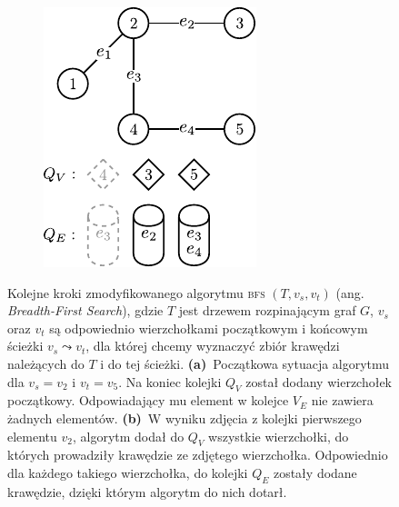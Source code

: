 \begin{savenotes}
\begin{figure}
\begin{subfigure}[b]{0.24\textwidth}
			\caption{}
			\label{fig:bfsExample:c}
		\end{subfigure}
		\hfill
		\begin{subfigure}[b]{0.24\textwidth}
			\includegraphics[width=\textwidth]{Chapter_V/BFS-example/d}
			\caption{}
			\label{fig:bfsExample:d}
		\end{subfigure}
		\hfill\null
		\caption[Kolejne kroki zmodyfikowanego algorytmu \textsc{bfs} $\left( T, v_{s}, v_{t} \right)$]{
			Kolejne kroki zmodyfikowanego algorytmu \textsc{bfs} $\left( T, v_{s}, v_{t} \right)$ (ang. \textit{Breadth-First Search}), gdzie $T$ jest drzewem rozpinającym graf $G$, $v_{s}$ oraz $v_{t}$ są odpowiednio wierzchołkami początkowym i końcowym ścieżki $v_{s} \leadsto v_{t}$, dla której chcemy wyznaczyć zbiór krawędzi należących do $T$ i do tej ścieżki.
			\textbf{(a)}~Początkowa sytuacja algorytmu dla $v_{s} = v_{2}$ i $v_{t} = v_{5}$. Na koniec kolejki $Q_{V}$ został dodany wierzchołek początkowy. Odpowiadający mu element w kolejce $V_{E}$ nie zawiera żadnych elementów.
			\textbf{(b)}~W wyniku zdjęcia z kolejki pierwszego elementu $v_{2}$, algorytm dodał do $Q_{V}$ wszystkie wierzchołki, do których prowadziły krawędzie ze zdjętego wierzchołka. Odpowiednio dla każdego takiego wierzchołka, do kolejki $Q_{E}$ zostały dodane krawędzie, dzięki którym algorytm do nich dotarł.
}
\end{figure}
\end{savenotes}
